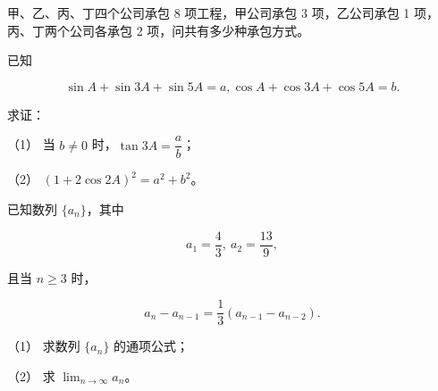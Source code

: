 \begin{question}
甲、乙、丙、丁四个公司承包 8 项工程，甲公司承包 3 项，乙公司承包 1 项，丙、丁两个公司各承包 2 项，问共有多少种承包方式。

\end{question}
\begin{question}
已知

\nopagebreak[4]
\[
\sin A+\sin3A+\sin5A=a,
\cos A+\cos3A+\cos5A=b.
\]

求证：

（1） 当 $b\ne0$ 时，$\tan3A=\dfrac ab$；

（2） $(1+2\cos2A)^2=a^2+b^2$。

\end{question}
\begin{question}
已知数列 $\{a_n\}$，其中

\nopagebreak[4]
\[
a_1=\frac43,\ a_2=\frac{13}{9},
\]

且当 $n\ge3$ 时，

\nopagebreak[4]
\[
a_n-a_{n-1}=\frac13(a_{n-1}-a_{n-2}).
\]

（1） 求数列 $\{a_n\}$ 的通项公式；

（2） 求 $\displaystyle\lim_{n\to\infty}a_n$。

\end{question}